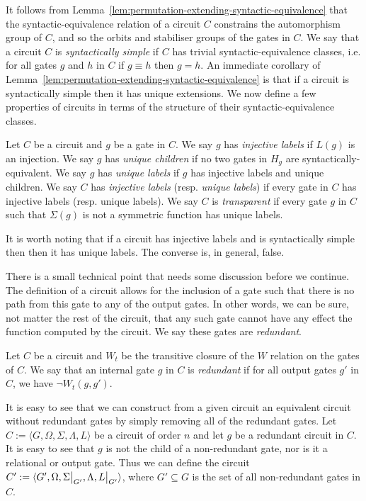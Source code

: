 \documentclass[../paper.tex]{subfiles}
\begin{document}
It follows from Lemma~\ref{lem:permutation-extending-syntactic-equivalence} that
the syntactic-equivalence relation of a circuit $C$ constrains the automorphism
group of $C$, and so the orbits and stabiliser groups of the gates in $C$. We
say that a circuit $C$ is \emph{syntactically simple} if $C$ has trivial
syntactic-equivalence classes, i.e. for all gates $g$ and $h$ in $C$ if $g
\equiv h$ then $g = h$. An immediate corollary of
Lemma~\ref{lem:permutation-extending-syntactic-equivalence} is that if a circuit
is syntactically simple then it has unique extensions. We now define a few
properties of circuits in terms of the structure of their syntactic-equivalence
classes.

\begin{definition}
  Let $C$ be a circuit and $g$ be a gate in $C$. We say $g$ has \emph{injective
    labels} if $L(g)$ is an injection. We say $g$ has \emph{unique children} if
  no two gates in $H_g$ are syntactically-equivalent. We say $g$ has
  \emph{unique labels} if $g$ has injective labels and unique children. We say
  $C$ has \emph{injective labels} (resp. \emph{unique labels}) if every gate in
  $C$ has injective labels (resp. unique labels). We say $C$ is
  \emph{transparent} if every gate $g$ in $C$ such that $\Sigma(g)$ is not a
  symmetric function has unique labels.
\end{definition}

It is worth noting that if a circuit has injective labels and is syntactically
simple then then it has unique labels. The converse is, in general, false.

There is a small technical point that needs some discussion before we continue.
The definition of a circuit allows for the inclusion of a gate such that there
is no path from this gate to any of the output gates. In other words, we can be
sure, not matter the rest of the circuit, that any such gate cannot have any
effect the function computed by the circuit. We say these gates are
\emph{redundant}.

\begin{definition}
  Let $C$ be a circuit and $W_t$ be the transitive closure of the $W$ relation
  on the gates of $C$. We say that an internal gate $g$ in $C$ is
  \emph{redundant} if for all output gates $g'$ in $C$, we have $\neg W_t (g,
  g')$.
\end{definition}

It is easy to see that we can construct from a given circuit an equivalent
circuit without redundant gates by simply removing all of the redundant gates.
Let $C := \langle G, \Omega, \Sigma, \Lambda, L \rangle$ be a circuit of order
$n$ and let $g$ be a redundant circuit in $C$. It is easy to see that $g$ is not
the child of a non-redundant gate, nor is it a relational or output gate. Thus
we can define the circuit $C' := \langle G', \Omega, \restr{\Sigma}{G'},
\Lambda, \restr{L}{G'} \rangle$, where $G' \subseteq G$ is the set of all
non-redundant gates in $C$.
\end{document}
